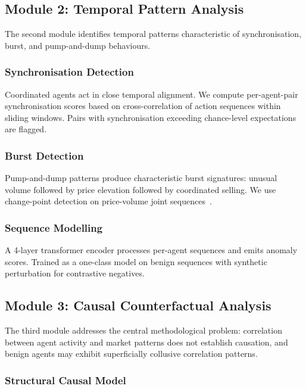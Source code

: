 \documentclass[sigconf,nonacm]{acmart}
\begin{document}
\subsection{Module 2: Temporal Pattern Analysis}

The second module identifies temporal patterns characteristic of
synchronisation, burst, and pump-and-dump behaviours.

\subsubsection{Synchronisation Detection}

Coordinated agents act in close temporal alignment. We compute
per-agent-pair synchronisation scores based on cross-correlation
of action sequences within sliding windows. Pairs with
synchronisation exceeding chance-level expectations are flagged.

\subsubsection{Burst Detection}

Pump-and-dump patterns produce characteristic burst signatures:
unusual volume followed by price elevation followed by
coordinated selling. We use change-point detection on price-volume
joint sequences~\cite{aminikhanghahi2024changepoint}.

\subsubsection{Sequence Modelling}

A 4-layer transformer encoder processes per-agent sequences and
emits anomaly scores. Trained as a one-class model on benign
sequences with synthetic perturbation for contrastive negatives.

\subsection{Module 3: Causal Counterfactual Analysis}

The third module addresses the central methodological problem:
correlation between agent activity and market patterns does not
establish causation, and benign agents may exhibit superficially
collusive correlation patterns.

\subsubsection{Structural Causal Model}
\end{document}
